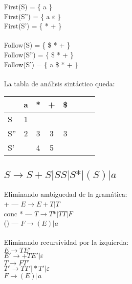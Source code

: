 \documentclass[11pt]{article} %
\begin{document}
First(S) = \{ a \} \\
First(S'') = \{ a $\varepsilon$ \} \\
First(S') =  \{ * + \} \\
\\
Follow(S) = \{ \$ * + \}\\
Follow(S'') = \{ \$ * + \}\\
Follow(S') = \{ a \$ * + \}\\
\\
La tabla de análisis sintáctico queda: \\
\begin{tabular}{l*{6}{c}r}
                  & a & * & + & \$ \\
\hline
S & 1 &   &   &   \\
S'' & 2 & 3 & 3 & 3 \\
S'  &   & 4 & 5 &   \\
\end{tabular}

\subsection{$S\rightarrow S+S\vert SS\vert S* \vert (S) \vert a$}
Eliminando ambiguedad de la gramática: \\
+ --- $E \rightarrow E + T \vert T$ \\
conc * --- $T \rightarrow T* \vert TT \vert F$ \\
() --- $F \rightarrow (E) \vert a$ \\
\\
Eliminando recursividad por la izquierda: \\
$E \rightarrow TE'$ \\
$E' \rightarrow +TE' \vert \varepsilon $ \\
$T \rightarrow FT'$ \\
$T' \rightarrow TT' \vert *T' \vert \varepsilon$ \\
$F \rightarrow (E) \vert a $ \\
\\
\end{document}
